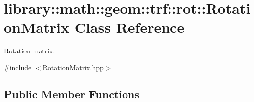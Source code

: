\hypertarget{classlibrary_1_1math_1_1geom_1_1trf_1_1rot_1_1_rotation_matrix}{}\section{library\+:\+:math\+:\+:geom\+:\+:trf\+:\+:rot\+:\+:Rotation\+Matrix Class Reference}
\label{classlibrary_1_1math_1_1geom_1_1trf_1_1rot_1_1_rotation_matrix}


Rotation matrix.  




{\ttfamily \#include $<$Rotation\+Matrix.\+hpp$>$}

\subsection*{Public Member Functions}
